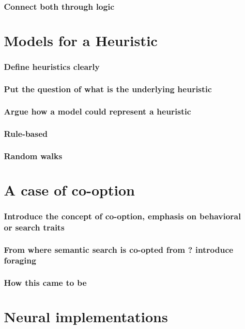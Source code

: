 \documentclass[11pt]{article}
\begin{document}
\subsubsection{Connect both through logic}
\label{sec:orge589a7b}
\newpage
\section{Models for a Heuristic}
\label{sec:org1af2711}
\subsubsection{Define heuristics clearly}
\label{sec:org49ee9eb}
\subsubsection{Put the question of what is the underlying heuristic}
\label{sec:org022977a}
\subsubsection{Argue how a model could represent a heuristic}
\label{sec:org0150a6d}
\subsubsection{Rule-based}
\label{sec:org0cc6752}
\subsubsection{Random walks}
\label{sec:orgbe9bd84}
\newpage
\section{A case of co-option}
\label{sec:org5f1d09f}
\subsubsection{Introduce the concept of co-option, emphasis on behavioral or search traits}
\label{sec:orgc83a8ae}
\subsubsection{From where semantic search is co-opted from ? introduce foraging}
\label{sec:orgcf84bac}
\subsubsection{How this came to be}
\label{sec:org422bbe4}
\newpage
\section{Neural implementations}
\label{sec:orgb5e48ca}
\end{document}
